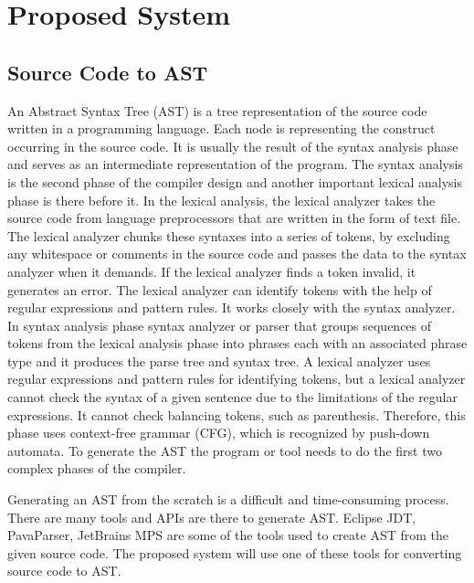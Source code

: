 \chapter{Proposed System}
 

   \section{Source Code to AST}
   An Abstract Syntax Tree (AST) is a tree representation of the source code written in a programming language. Each node is representing the construct occurring in the source code. It is usually the result of the syntax analysis phase and serves as an intermediate representation of the program. The syntax analysis is the second phase of the compiler design and another important lexical analysis phase  is there before it. In the lexical analysis, the lexical analyzer takes the source code from
   language preprocessors that are written in the form of text file. The lexical analyzer chunks
   these syntaxes into a series of tokens, by excluding any whitespace or comments in the
   source code and passes the data to the syntax analyzer when it demands.
   If the lexical analyzer finds a token invalid, it generates an error. The lexical analyzer can identify tokens with the help of regular expressions
   and pattern rules. It works
   closely with the syntax analyzer.  In syntax analysis phase syntax analyzer or parser that groups sequences of tokens from the lexical
   analysis phase into phrases each with an associated phrase type and it produces the parse tree and syntax tree.  A lexical analyzer uses regular expressions
   and pattern rules for identifying tokens, but a lexical analyzer cannot check the syntax of a given sentence due to
   the limitations of the regular expressions. It cannot check balancing
   tokens, such as parenthesis. Therefore, this phase uses context-free grammar (CFG), which
   is recognized by push-down automata. To generate the AST the program or tool needs to do the first two complex phases of the compiler.
   
   Generating an AST from the scratch is a difficult and time-consuming process. There are many tools and APIs are there to generate AST. Eclipse JDT, PavaParser, JetBrains MPS are some of the tools used to create AST from the given source code. The proposed system will use one of these tools for converting source code to AST.
